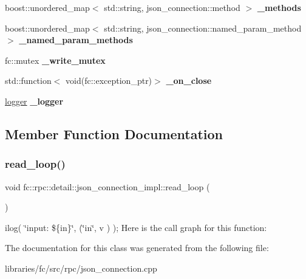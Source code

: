 \begin{DoxyCompactItemize}
boost\+::unordered\+\_\+map$<$ std\+::string, json\+\_\+connection\+::method $>$ {\bfseries \+\_\+methods}
\item 
\mbox{\label{classfc_1_1rpc_1_1detail_1_1json__connection__impl_aee124bc8bdf18788eaee7deed28c7d2e}} 
boost\+::unordered\+\_\+map$<$ std\+::string, json\+\_\+connection\+::named\+\_\+param\+\_\+method $>$ {\bfseries \+\_\+named\+\_\+param\+\_\+methods}
\item 
\mbox{\label{classfc_1_1rpc_1_1detail_1_1json__connection__impl_a488ef505176eb031d9dc4f003e0a1261}} 
fc\+::mutex {\bfseries \+\_\+write\+\_\+mutex}
\item 
\mbox{\label{classfc_1_1rpc_1_1detail_1_1json__connection__impl_addcbc34d8e5a9bcdcb037beffa9f05fe}} 
std\+::function$<$ void(fc\+::exception\+\_\+ptr)$>$ {\bfseries \+\_\+on\+\_\+close}
\item 
\mbox{\label{classfc_1_1rpc_1_1detail_1_1json__connection__impl_a84b8d497ecc0fbbd1df03aeb8880da50}} 
\mbox{\hyperlink{classfc_1_1logger}{logger}} {\bfseries \+\_\+logger}
\end{DoxyCompactItemize}


\subsection{Member Function Documentation}
\mbox{\label{classfc_1_1rpc_1_1detail_1_1json__connection__impl_a0f5c981d6620a6a6a3c659aa3a6a23e4}} 
\subsubsection{\texorpdfstring{read\+\_\+loop()}{read\_loop()}}
{\footnotesize\ttfamily void fc\+::rpc\+::detail\+::json\+\_\+connection\+\_\+impl\+::read\+\_\+loop (\begin{DoxyParamCaption}{ }\end{DoxyParamCaption})\hspace{0.3cm}{\ttfamily [inline]}}

ilog( \char`\"{}input\+: \$\{in\}\char`\"{}, (\char`\"{}in\char`\"{}, v ) ); Here is the call graph for this function\+:


The documentation for this class was generated from the following file\+:\begin{DoxyCompactItemize}
\item 
libraries/fc/src/rpc/json\+\_\+connection.\+cpp\end{DoxyCompactItemize}

